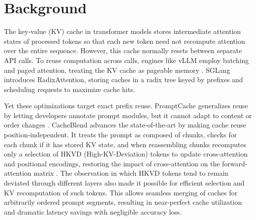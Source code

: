 \section{Background}
\label{sec:ch2_bg}

The key-value (KV) cache in transformer models stores intermediate attention states of processed tokens so that each new token need not recompute attention over the entire sequence. However, this cache normally resets between separate API calls. To reuse computation across calls, engines like vLLM employ batching and paged attention, treating the KV cache as pageable memory \cite{kwon2023vllm}. SGLang \cite{zheng2024sglangefficientexecutionstructured} introduces RadixAttention, storing caches in a radix tree keyed by prefixes and scheduling requests to maximize cache hits.

Yet these optimizations target exact prefix reuse. PromptCache  generalizes reuse by letting developers annotate prompt modules, but it cannot adapt to content or order changes \cite{gim2024promptcachemodularattention}. CacheBlend advances the state-of-the-art by making cache reuse position-independent. It treats the prompt as composed of chunks, checks for each chunk if it has stored KV state, and when reassembling chunks recomputes only a selection of HKVD (High-KV-Deviation) tokens to update cross-attention and positional encodings, restoring the impact of cross-attention on the forward-attention matrix \cite{yao2025cacheblendfastlargelanguage}. The observation in which HKVD tokens tend to remain deviated through different layers also made it possible for efficient selection and KV recomputation of such tokens. This allows seamless merging of caches for arbitrarily ordered prompt segments, resulting in near-perfect cache utilization and dramatic latency savings with negligible accuracy loss.
